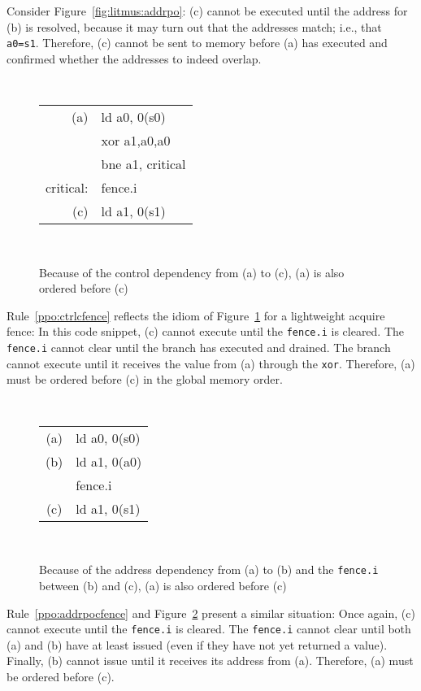 Consider Figure~\ref{fig:litmus:addrpo}:
(c) cannot be executed until the address for (b) is resolved, because it may turn out that the addresses match; i.e., that {\tt a0=s1}.  Therefore, (c) cannot be sent to memory before (a) has executed and confirmed whether the addresses to indeed overlap.

\begin{figure}[h!]
  \centering
  {
    \tt\small
    \begin{tabular}{rl}
    (a)       & ld a0, 0(s0) \\
              & xor a1,a0,a0 \\
              & bne a1, critical \\
    critical: & fence.i \\
    (c)       & ld a1, 0(s1) \\
    \end{tabular}
  }
  ~~~~
  \diagram
  \caption{Because of the control dependency from (a) to (c), (a) is also ordered before (c)}
  \label{fig:litmus:ctrlcfence}
\end{figure}

Rule~\ref{ppo:ctrlcfence} reflects the idiom of Figure~\ref{fig:litmus:ctrlcfence} for a lightweight acquire fence:
In this code snippet, (c) cannot execute until the {\tt fence.i} is cleared.  The {\tt fence.i} cannot clear until the branch has executed and drained.  The branch cannot execute until it receives the value from (a) through the {\tt xor}.  Therefore, (a) must be ordered before (c) in the global memory order.

\begin{figure}[h!]
  \centering
  {
    \tt\small
    \begin{tabular}{cl}
    (a)       & ld a0, 0(s0) \\
    (b)       & ld a1, 0(a0) \\
              & fence.i \\
    (c)       & ld a1, 0(s1) \\
    \end{tabular}
  }
  ~~~~
  \diagram
  \caption{Because of the address dependency from (a) to (b) and the {\tt fence.i} between (b) and (c), (a) is also ordered before (c)}
  \label{fig:litmus:addrpocfence}
\end{figure}

Rule~\ref{ppo:addrpocfence} and Figure~\ref{fig:litmus:addrpocfence} present a similar situation:
Once again, (c) cannot execute until the {\tt fence.i} is cleared.  The {\tt fence.i} cannot clear until both (a) and (b) have at least issued (even if they have not yet returned a value).  Finally, (b) cannot issue until it receives its address from (a).  Therefore, (a) must be ordered before (c).


